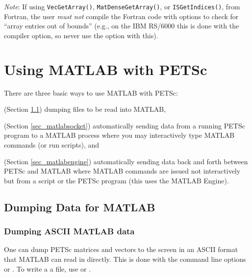 {\em Note}: If using \lstinline{VecGetArray()}, \lstinline{MatDenseGetArray()}, or \lstinline{ISGetIndices()},
from Fortran, the user {\em must not} compile the Fortran code with options
to check for ``array entries out of bounds'' (e.g., on the IBM RS/6000 this
is done with the  compiler option, so never use the  option with this).


\cleardoublepage
\chapter{Using MATLAB with PETSc}
\label{ch_matlab}

There are three basic ways to use MATLAB with PETSc: 
\begin{tightenumerate}
  \item (Section \ref{sec_matlabdump}) dumping files to be read into MATLAB,
  \item (Section \ref{sec_matlabsocket}) automatically sending data from a running PETSc program
to a MATLAB process where you may interactively type MATLAB commands (or run
scripts), and 
\item (Section \ref{sec_matlabengine}) automatically sending data back and forth between PETSc and
MATLAB where MATLAB commands are issued not interactively but from a script or
the PETSc program (this uses the MATLAB Engine).
\end{tightenumerate}

\section{Dumping Data for MATLAB}
\label{sec_matlabdump}
\subsection{Dumping ASCII MATLAB data}
One can dump PETSc matrices and vectors to the screen in an ASCII format that MATLAB can read in directly. This is done with the
command line options  or . 
To write a a file, use  or .

